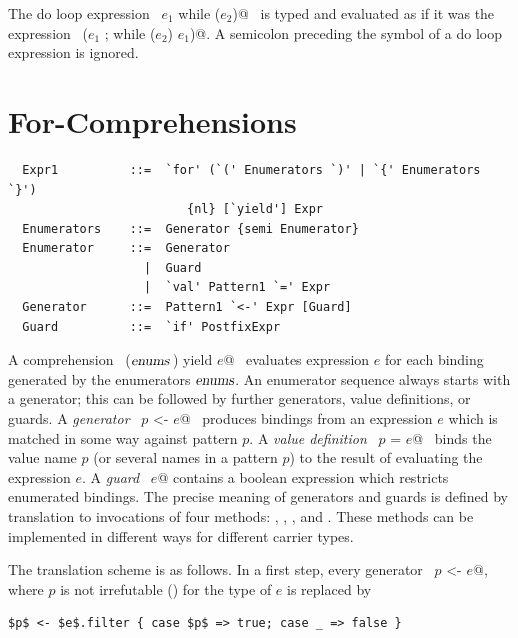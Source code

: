 The do loop expression ~\lstinline@do $e_1$ while ($e_2$)@~ is typed and
evaluated as if it was the expression ~\lstinline@($e_1$ ; while ($e_2$) $e_1$)@.
A semicolon preceding the  symbol of a do loop expression is ignored.

\section{For-Comprehensions}\label{sec:for-comprehensions}

\syntax\begin{lstlisting}
  Expr1          ::=  `for' (`(' Enumerators `)' | `{' Enumerators `}') 
                         {nl} [`yield'] Expr
  Enumerators    ::=  Generator {semi Enumerator}
  Enumerator     ::=  Generator 
                   |  Guard
                   |  `val' Pattern1 `=' Expr
  Generator      ::=  Pattern1 `<-' Expr [Guard]
  Guard          ::=  `if' PostfixExpr
\end{lstlisting}

A comprehension ~\lstinline@for ($\mbox{\sl enums}\,$) yield $e$@~ evaluates
expression $e$ for each binding generated by the enumerators
$\mbox{\sl enums}$. An enumerator sequence always starts with a generator; this
can be followed by further generators, value definitions, or guards.
A {\em generator} ~\lstinline@$p$ <- $e$@~ produces bindings from
an expression $e$ which is matched in some way against pattern $p$. A
{\em value definition} ~\lstinline@val $p$ = $e$@~ binds the value
name $p$ (or several names in a pattern $p$) to the result of
evaluating the expression $e$. 
A {\em guard} ~\lstinline@if $e$@ contains a boolean expression 
which restricts enumerated bindings. The precise meaning
of generators and guards is defined by translation to invocations of
four methods: , , , and
. These methods can be implemented in different ways for
different carrier types.  

The translation scheme is as follows.  In a first step, every
generator ~\lstinline@$p$ <- $e$@, where $p$ is not irrefutable ()
for the type of $e$ is replaced by
\begin{lstlisting}
$p$ <- $e$.filter { case $p$ => true; case _ => false }
\end{lstlisting}

